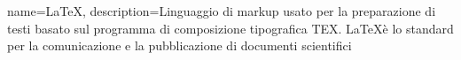 {
	name=LaTeX,
	description={Linguaggio di markup usato per la preparazione di testi basato sul programma di composizione tipografica TEX. \LaTeX è lo standard per la comunicazione e la pubblicazione di documenti scientifici}
}
